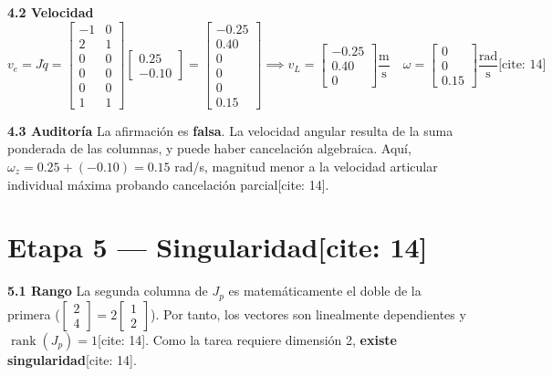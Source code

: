 \documentclass[11pt, a4paper]{article}
\begin{document}
\textbf{4.2 Velocidad}
\begin{equation*}
    v_e = J\dot{q} = \begin{bmatrix} -1 & 0 \\ 2 & 1 \\ 0 & 0 \\ 0 & 0 \\ 0 & 0 \\ 1 & 1 \end{bmatrix} \begin{bmatrix} 0.25 \\ -0.10 \end{bmatrix} = \boxed{ \begin{bmatrix} -0.25 \\ 0.40 \\ 0 \\ 0 \\ 0 \\ 0.15 \end{bmatrix} } \implies v_L = \boxed{ \begin{bmatrix} -0.25 \\ 0.40 \\ 0 \end{bmatrix} \frac{\text{m}}{\text{s}} } \quad \omega = \boxed{ \begin{bmatrix} 0 \\ 0 \\ 0.15 \end{bmatrix} \frac{\text{rad}}{\text{s}} } \text{[cite: 14]}
\end{equation*}

\textbf{4.3 Auditoría}
La afirmación es \textbf{falsa}. La velocidad angular resulta de la suma ponderada de las columnas, y puede haber cancelación algebraica. Aquí, $\omega_z = 0.25 + (-0.10) = 0.15$ rad/s, magnitud menor a la velocidad articular individual máxima probando cancelación parcial[cite: 14].

\section*{Etapa 5 — Singularidad[cite: 14]}

\textbf{5.1 Rango}
La segunda columna de $J_p$ es matemáticamente el doble de la primera ($\begin{bmatrix} 2 \\ 4 \end{bmatrix} = 2\begin{bmatrix} 1 \\ 2 \end{bmatrix}$). Por tanto, los vectores son linealmente dependientes y $\boxed{\operatorname{rank}(J_p) = 1}$[cite: 14]. Como la tarea requiere dimensión 2, \textbf{existe singularidad}[cite: 14].
\end{document}
